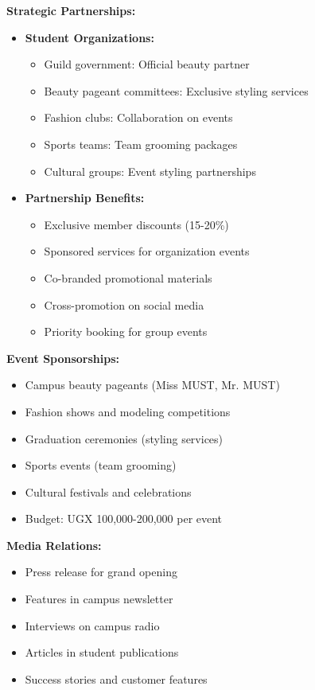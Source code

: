 \documentclass[a4paper,12pt]{article}
\begin{document}
\textbf{Strategic Partnerships:}
\begin{itemize}[leftmargin=2em]
    \item \textbf{Student Organizations:}
    \begin{itemize}
        \item Guild government: Official beauty partner
        \item Beauty pageant committees: Exclusive styling services
        \item Fashion clubs: Collaboration on events
        \item Sports teams: Team grooming packages
        \item Cultural groups: Event styling partnerships
    \end{itemize}
    
    \item \textbf{Partnership Benefits:}
    \begin{itemize}
        \item Exclusive member discounts (15-20\%)
        \item Sponsored services for organization events
        \item Co-branded promotional materials
        \item Cross-promotion on social media
        \item Priority booking for group events
    \end{itemize}
\end{itemize}

\textbf{Event Sponsorships:}
\begin{itemize}[leftmargin=2em]
    \item Campus beauty pageants (Miss MUST, Mr. MUST)
    \item Fashion shows and modeling competitions
    \item Graduation ceremonies (styling services)
    \item Sports events (team grooming)
    \item Cultural festivals and celebrations
    \item Budget: UGX 100,000-200,000 per event
\end{itemize}

\textbf{Media Relations:}
\begin{itemize}[leftmargin=2em]
    \item Press release for grand opening
    \item Features in campus newsletter
    \item Interviews on campus radio
    \item Articles in student publications
    \item Success stories and customer features
\end{itemize}
\end{document}
